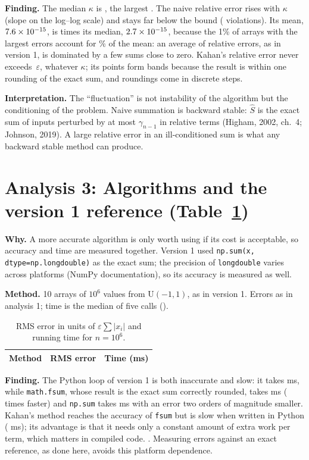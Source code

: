 \documentclass[11pt,a4paper]{article}
\begin{document}
\textbf{Finding.} The median $\kappa$ is \KappaMedian{}, the largest \KappaMax{}. The naive relative error rises with
$\kappa$ (slope \CondSlope{} on the log--log scale) and stays far below the bound (\BoundViolations{} violations). Its mean,
$7.6\times 10^{-15}$, is \MeanOverMedian{} times its median, $2.7\times 10^{-15}$, because the 1\% of arrays with the largest errors account for
\TopShare\% of the mean: an average of relative errors, as in version 1, is dominated by a few sums close to zero. Kahan's
relative error never exceeds \KahanMaxEps{}$\,\varepsilon$, whatever $\kappa$; its points form bands because the result is
within one rounding of the exact sum, and roundings come in discrete steps.

\textbf{Interpretation.} The ``fluctuation'' is not instability of the algorithm but the conditioning of the problem.
Naive summation is backward stable: $\hat S$ is the exact sum of inputs perturbed by at most $\gamma_{n-1}$ in relative
terms (Higham, 2002, ch.~4; Johnson, 2019). A large relative error in an ill-conditioned sum is what any backward stable
method can produce.

\section{Analysis 3: Algorithms and the version 1 reference (Table~\ref{tab:algos})}

\textbf{Why.} A more accurate algorithm is only worth using if its cost is acceptable, so accuracy and time are measured
together. Version 1 used \texttt{np.sum(x, dtype=np.longdouble)} as the exact sum; the precision of \texttt{longdouble}
varies across platforms (NumPy documentation), so its accuracy is measured as well.

\textbf{Method.} 10 arrays of $10^6$ values from $\mathrm{U}(-1,1)$, as in version 1. Errors as in analysis 1; time is the
median of five calls (\Machine).

\begin{table}[h]
\centering\footnotesize
\caption{RMS error in units of $\varepsilon\sum|x_i|$ and running time for $n = 10^6$.}\label{tab:algos}
\begin{tabular}{lrr}
\toprule
Method & RMS error & Time (ms) \\
\midrule

\end{tabular}
\end{table}

\textbf{Finding.} The Python loop of version 1 is both inaccurate and slow: it takes \TimeLoop{} ms,
while \texttt{math.fsum}, whose result is the exact sum correctly rounded, takes \TimeFsum{} ms (\LoopOverFsum{} times
faster) and \texttt{np.sum} takes \TimeNpSum{} ms with an error two orders of magnitude smaller. Kahan's method reaches the
accuracy of \texttt{fsum} but is slow when written in Python (\TimeKahan{} ms); its advantage is that it needs only a constant
amount of extra work per term, which matters in compiled code. \LongdoubleSentence. Measuring errors against an exact
reference, as done here, avoids this platform dependence.
\end{document}
